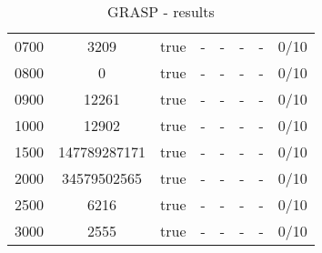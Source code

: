 \begin{table}[H]
{\begin{tabular}{|| c | c | c | c | c | c | c | c ||}
			0700 & 3209 & true & - & - & - & - & 0/10 \\
			0800 & 0 & true & - & - & - & - & 0/10 \\
			0900 & 12261 & true & - & - & - & - & 0/10 \\
			1000 & 12902 & true & - & - & - & - & 0/10 \\
			1500 & 147789287171 & true & - & - & - & - & 0/10 \\
			2000 & 34579502565 & true & - & - & - & - & 0/10 \\
			2500 & 6216 & true & - & - & - & - & 0/10 \\
			3000 & 2555 & true & - & - & - & - & 0/10 \\
			\hline
		\end{tabular}
	}
	\caption{GRASP - results}
\end{table}
